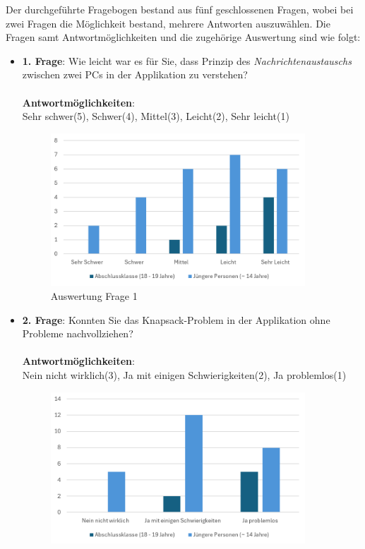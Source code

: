 Der durchgeführte Fragebogen bestand aus fünf geschlossenen Fragen, wobei bei zwei Fragen die Möglichkeit bestand, mehrere
Antworten auszuwählen. Die Fragen samt Antwortmöglichkeiten und die zugehörige Auswertung sind wie folgt:
\begin{itemize}
    \item \textbf{1. Frage}: Wie leicht war es für Sie, dass Prinzip des \textit{Nachrichtenaustauschs} zwischen zwei PCs in der Applikation zu verstehen?
    \\
    \\
    \textbf{Antwortmöglichkeiten}:\\
    Sehr schwer(5), Schwer(4), Mittel(3), Leicht(2), Sehr leicht(1)
    \\
    \begin{figure}[H]
        \centering
        \includegraphics[width=0.9\textwidth]{images/AuswertungFrage1}
        \caption{Auswertung Frage 1}
        \label{fig:fr1}
    \end{figure}
    \item \textbf{2. Frage}: Konnten Sie das Knapsack-Problem in der Applikation ohne Probleme nachvollziehen?
    \\
    \\
    \textbf{Antwortmöglichkeiten}:\\
    Nein nicht wirklich(3), Ja mit einigen Schwierigkeiten(2), Ja problemlos(1)
    \\
    \begin{figure}[H]
        \centering
        \includegraphics[width=0.9\textwidth]{images/AuswertungFrage2}

\end{figure}
\end{itemize}
